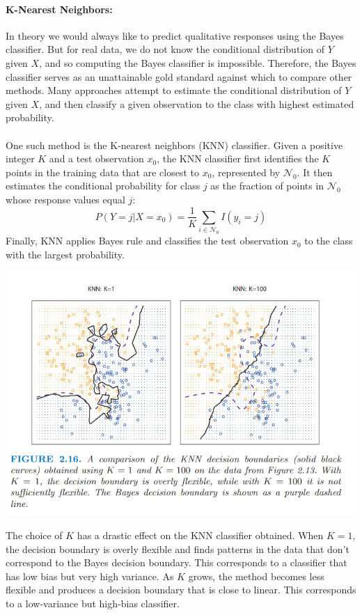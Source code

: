 \paragraph{K-Nearest Neighbors:} 
In theory we would always like to predict qualitative responses using the Bayes classifier. But for real data, we do not know the conditional distribution of $Y$ given $X$, and so computing the Bayes classifier is impossible. Therefore, the Bayes classifier serves as an unattainable gold standard against which to compare other methods. Many approaches attempt to estimate the conditional distribution of $Y$ given $X$, and then classify a given observation to the class with highest estimated probability.\\\\
One such method is the K-nearest neighbors (KNN) classifier. Given a positive integer $K$ and a test observation $x_0$, the KNN classifier first identifies the $K$ points in the training data that are closest to $x_0$, represented by $\mathcal{N}_0$. It then estimates the conditional probability for class $j$ as the fraction of points in $\mathcal{N}_0$ whose response values equal $j$:
\begin{equation}
    P(Y = j | X = x_0) = \frac{1}{K} \sum_{i \in \mathcal{N}_0} I(y_i = j)
\end{equation}
Finally, KNN applies Bayes rule and classifies the test observation $x_0$ to the class with the largest probability.
\begin{center}
    \includegraphics[scale=0.8]{images/knn-classification.png}
\end{center}
The choice of $K$ has a drastic effect on the KNN classifier obtained. When $K = 1$, the decision boundary is overly flexible and finds patterns in the data that don’t correspond to the Bayes decision boundary. This corresponds to a classifier that has low bias but very high variance. As $K$ grows, the method becomes less flexible and produces a decision boundary that is close to linear. This corresponds to a low-variance but high-bias classifier.
